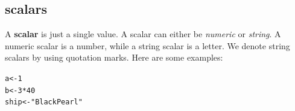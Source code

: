 \documentclass{tufte-book}\usepackage[]{graphicx}\usepackage[]{color}
\makeatletter
\newcommand{\hlnum}[1]{\textcolor[rgb]{0.686,0.059,0.569}{#1}}%
\newcommand{\hlstr}[1]{\textcolor[rgb]{0.192,0.494,0.8}{#1}}%
\newcommand{\hlopt}[1]{\textcolor[rgb]{0,0,0}{#1}}%
\newcommand{\hlstd}[1]{\textcolor[rgb]{0.345,0.345,0.345}{#1}}%
\newcommand{\hlkwb}[1]{\textcolor[rgb]{0.69,0.353,0.396}{#1}}%
\newenvironment{kframe}{%
 \def\at@end@of@kframe{}%
 \ifinner\ifhmode%
  \def\at@end@of@kframe{\end{minipage}}%
  \begin{minipage}{\columnwidth}%
 \fi\fi%
 \def\FrameCommand##1{\hskip\@totalleftmargin \hskip-\fboxsep
 \colorbox{shadecolor}{##1}\hskip-\fboxsep
     \hskip-\linewidth \hskip-\@totalleftmargin \hskip\columnwidth}%
 \MakeFramed {\advance\hsize-\width
   \@totalleftmargin\z@ \linewidth\hsize
   \@setminipage}}%
 {\par\unskip\endMakeFramed%
 \at@end@of@kframe}
\newenvironment{knitrout}{}{} %
\makeatother
\begin{document}
\subsection{scalars}

A \textbf{scalar} is just a single value. A scalar can either be \textit{numeric} or \textit{string}. A numeric scalar is a number, while a string scalar is a letter. We denote string scalars by using quotation marks. Here are some examples:

\begin{knitrout}
\color{fgcolor}\begin{kframe}
\begin{alltt}
\hlstd{a} \hlkwb{<-} \hlnum{1}
\hlstd{b} \hlkwb{<-} \hlnum{3} \hlopt{*} \hlnum{40}
\hlstd{ship} \hlkwb{<-} \hlstr{"Black Pearl"}
\end{alltt}
\end{kframe}
\end{knitrout}
\end{document}
